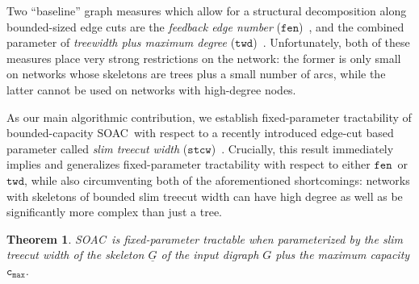\documentclass[letterpaper]{article} %
\newtheorem{theorem}{Theorem}
\newcommand{\problem}{{\sc SOAC}\xspace} %
\newcommand{\cmax}{\mathtt{c_{max}}}
\newcommand{\fen}{\ensuremath{\mathtt{fen}}}
\newcommand{\twd}{\ensuremath{\mathtt{twd}}}
\newcommand{\stcw}{\ensuremath{\mathtt{stcw}}}
\begin{document}
Two ``baseline'' graph measures which allow for a structural decomposition along bounded-sized edge cuts are the \emph{feedback edge number} (\fen)~\cite{KoanaKNNZ21,FuchsleMNR22},
and the combined parameter of \emph{treewidth plus maximum degree} (\twd)~\cite{OrdyniakS13,GozupekOPSS17}.  Unfortunately, both of these measures place very strong restrictions on the network: the former is only small on networks whose skeletons are trees plus a small number of arcs, while the latter cannot be used on networks with high-degree nodes.

As our main algorithmic contribution, we establish fixed-parameter tractability of bounded-capacity \problem\ with respect to a recently introduced edge-cut based parameter called \emph{slim treecut width} (\stcw)~\cite{GanianK22}. Crucially, this result immediately implies and generalizes fixed-parameter tractability with respect to either \fen\ or \twd, while also circumventing both of the aforementioned shortcomings: networks with skeletons of bounded slim treecut width can have high degree as well as be significantly more complex than just a tree.

\begin{theorem}
\label{thm:stcwfpt}
\problem\ is fixed-parameter tractable when parameterized by the slim treecut width of the skeleton $\underline G$ of the input digraph $G$ plus the maximum capacity $\cmax$.
\end{theorem}
\end{document}
